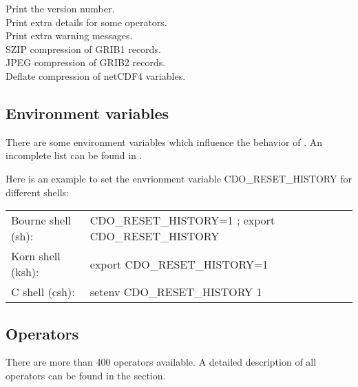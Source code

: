 \begin{tabbing}
         \> Print the version number. \\
         \> Print extra details for some operators. \\
         \> Print extra warning messages. \\
         \> SZIP compression of GRIB1 records. \\
         \> JPEG compression of GRIB2 records. \\
         \> Deflate compression of netCDF4 variables. \\
\end{tabbing}

\subsection{Environment variables}

There are some environment variables which influence the behavior of {\CDO}. 
An incomplete list can be found in .

Here is an example to set the envrionment variable CDO\_RESET\_HISTORY for different shells:

\begin{tabular}[b]{ll}
Bourne shell (sh): & CDO\_RESET\_HISTORY=1 ; export CDO\_RESET\_HISTORY \\
Korn shell (ksh):   & export CDO\_RESET\_HISTORY=1 \\
C shell (csh):        & setenv CDO\_RESET\_HISTORY 1 \\
\end{tabular}


\subsection{Operators}

There are more than 400 operators available.
A detailed description of all operators can be found in the
{\bf {}} section.


